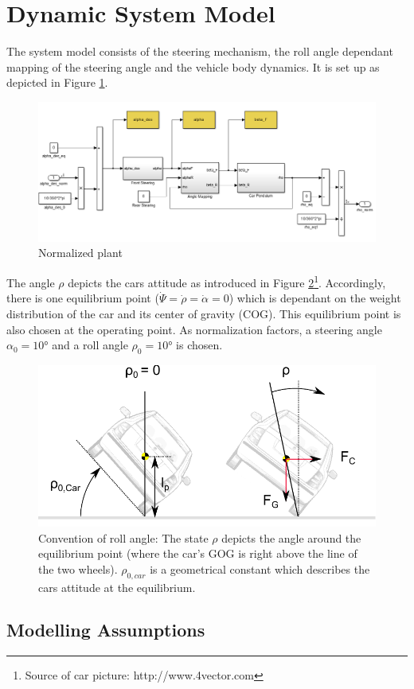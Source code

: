 \documentclass[conference]{IEEEtran}
\begin{document}
\section{Dynamic System Model}

The system model consists of the steering mechanism, the roll angle dependant mapping of the steering angle and the vehicle body dynamics. It is set up as depicted in Figure \ref{figure:P_car}. 

\begin{figure}[h]
\centering
  \includegraphics[width=.47\textwidth]{pics/P_car.png} 
  \caption{Normalized plant}  
  \label{figure:P_car}
\end{figure}

The angle $\rho$ depicts the cars attitude as introduced in Figure \ref{figure:car_from_back}\footnote{Source of car picture: http://www.4vector.com}. Accordingly, there is one equilibrium point ($\dot{\Psi} = \dot{\rho} = \dot{\alpha} = 0$) which is dependant on the weight distribution of the car and its center of gravity (COG). This equilibrium point is also chosen at the operating point. As normalization factors, a steering angle $\alpha_{0}=10°$ and a roll angle $\rho_{0}=10°$ is chosen.

\begin{figure}[h]
\centering
  \includegraphics[width=.47\textwidth]{pics/car_from_back} 
  \caption{Convention of roll angle: The state $\rho$ depicts the angle around the equilibrium point (where the car's GOG is right above the line of the two wheels). $\rho_{0,car}$ is a geometrical constant which describes the cars attitude at the equilibrium.}  
  \label{figure:car_from_back}
\end{figure}



\subsection{Modelling Assumptions}
\end{document}
